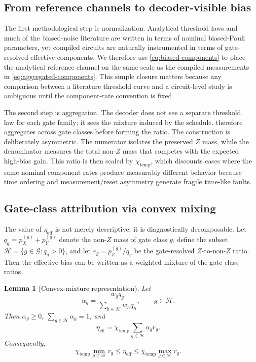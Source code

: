 \documentclass{article} %
\newtheorem{lemma}[theorem]{Lemma}
\begin{document}
\subsection{From reference channels to decoder-visible bias}

The first methodological step is normalization. Analytical threshold laws and much of the biased-noise literature are written in terms of nominal biased-Pauli parameters, yet compiled circuits are naturally instrumented in terms of gate-resolved effective components. We therefore use \eqref{eq:biased-components} to place the analytical reference channel on the same scale as the compiled measurements in \eqref{eq:aggregated-components}. This simple closure matters because any comparison between a literature threshold curve and a circuit-level study is ambiguous until the component-rate convention is fixed.

The second step is aggregation. The decoder does not see a separate threshold law for each gate family; it sees the mixture induced by the schedule.  therefore aggregates across gate classes before forming the ratio. The construction is deliberately asymmetric. The numerator isolates the preserved $Z$ mass, while the denominator measures the total non-$Z$ mass that competes with the expected high-bias gain. This ratio is then scaled by $\chi_{\mathrm{temp}}$, which discounts cases where the same nominal component rates produce measurably different behavior because time ordering and measurement/reset asymmetry generate fragile time-like faults.

\subsection{Gate-class attribution via convex mixing}

The value of $\eta_{\mathrm{eff}}$ is not merely descriptive; it is diagnostically decomposable. Let $q_g = p_X^{(g)} + p_Y^{(g)}$ denote the non-$Z$ mass of gate class $g$, define the subset $\mathcal{H} = \{g \in \mathcal{G} : q_g > 0\}$, and let $r_g = p_Z^{(g)}/q_g$ be the gate-resolved $Z$-to-non-$Z$ ratio. Then the effective bias can be written as a weighted mixture of the gate-class ratios.

\begin{lemma}[Convex-mixture representation]
\label{lem:convex}
Let
\begin{equation}
\label{eq:alpha-def}
\alpha_g =
\frac{w_g q_g}{\sum_{h \in \mathcal{H}} w_h q_h},
\qquad g \in \mathcal{H}.
\end{equation}
Then $\alpha_g \ge 0$, $\sum_{g \in \mathcal{H}} \alpha_g = 1$, and
\begin{equation}
\label{eq:convex-representation}
\eta_{\mathrm{eff}}
=
\chi_{\mathrm{temp}}
\sum_{g \in \mathcal{H}} \alpha_g r_g.
\end{equation}
Consequently,
\begin{equation}
\label{eq:interval-bound}
\chi_{\mathrm{temp}} \min_{g \in \mathcal{H}} r_g
\le
\eta_{\mathrm{eff}}
\le
\chi_{\mathrm{temp}} \max_{g \in \mathcal{H}} r_g.
\end{equation}
\end{lemma}
\end{document}
